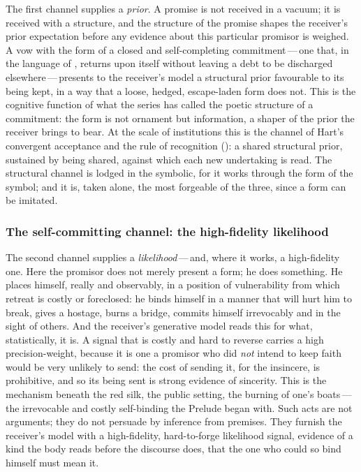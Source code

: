 The first channel supplies a \emph{prior}. A promise is not received in a vacuum; it is received with a structure, and the structure of the promise shapes the receiver's prior expectation before any evidence about this particular promisor is weighed. A vow with the form of a closed and self-completing commitment\,---\,one that, in the language of , returns upon itself without leaving a debt to be discharged elsewhere\,---\,presents to the receiver's model a structural prior favourable to its being kept, in a way that a loose, hedged, escape-laden form does not. This is the cognitive function of what the series has called the poetic structure of a commitment: the form is not ornament but information, a shaper of the prior the receiver brings to bear. At the scale of institutions this is the channel of Hart's convergent acceptance and the rule of recognition (): a shared structural prior, sustained by being shared, against which each new undertaking is read. The structural channel is lodged in the symbolic, for it works through the form of the symbol; and it is, taken alone, the most forgeable of the three, since a form can be imitated.

\subsubsection{The self-committing channel: the high-fidelity likelihood}
\label{p13:sub:mech-likelihood}

The second channel supplies a \emph{likelihood}\,---\,and, where it works, a high-fidelity one. Here the promisor does not merely present a form; he does something. He places himself, really and observably, in a position of vulnerability from which retreat is costly or foreclosed: he binds himself in a manner that will hurt him to break, gives a hostage, burns a bridge, commits himself irrevocably and in the sight of others. And the receiver's generative model reads this for what, statistically, it is. A signal that is costly and hard to reverse carries a high precision-weight, because it is one a promisor who did \emph{not} intend to keep faith would be very unlikely to send: the cost of sending it, for the insincere, is prohibitive, and so its being sent is strong evidence of sincerity. This is the mechanism beneath the red silk, the public setting, the burning of one's boats\,---\,the irrevocable and costly self-binding the Prelude began with. Such acts are not arguments; they do not persuade by inference from premises. They furnish the receiver's model with a high-fidelity, hard-to-forge likelihood signal, evidence of a kind the body reads before the discourse does, that the one who could so bind himself must mean it.

